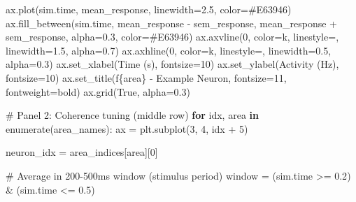 \documentclass[
  11pt,
  letterpaper,
  oneside,
  openany]{book}
\newenvironment{Shaded}{\begin{snugshade}}{\end{snugshade}}
\newcommand{\BuiltInTok}[1]{\textcolor[rgb]{0.00,0.23,0.31}{#1}}
\newcommand{\CommentTok}[1]{\textcolor[rgb]{0.37,0.37,0.37}{#1}}
\newcommand{\ControlFlowTok}[1]{\textcolor[rgb]{0.00,0.23,0.31}{\textbf{#1}}}
\newcommand{\DecValTok}[1]{\textcolor[rgb]{0.68,0.00,0.00}{#1}}
\newcommand{\FloatTok}[1]{\textcolor[rgb]{0.68,0.00,0.00}{#1}}
\newcommand{\KeywordTok}[1]{\textcolor[rgb]{0.00,0.23,0.31}{\textbf{#1}}}
\newcommand{\NormalTok}[1]{\textcolor[rgb]{0.00,0.23,0.31}{#1}}
\newcommand{\OperatorTok}[1]{\textcolor[rgb]{0.37,0.37,0.37}{#1}}
\newcommand{\SpecialCharTok}[1]{\textcolor[rgb]{0.37,0.37,0.37}{#1}}
\newcommand{\SpecialStringTok}[1]{\textcolor[rgb]{0.13,0.47,0.30}{#1}}
\newcommand{\StringTok}[1]{\textcolor[rgb]{0.13,0.47,0.30}{#1}}
\newcommand{\VariableTok}[1]{\textcolor[rgb]{0.07,0.07,0.07}{#1}}
\begin{document}
\begin{Shaded}
\begin{Highlighting}[]
\NormalTok{    ax.plot(sim.time, mean\_response, linewidth}\OperatorTok{=}\FloatTok{2.5}\NormalTok{, color}\OperatorTok{=}\StringTok{\textquotesingle{}\#E63946\textquotesingle{}}\NormalTok{)}
\NormalTok{    ax.fill\_between(sim.time, mean\_response }\OperatorTok{{-}}\NormalTok{ sem\_response, }
\NormalTok{                    mean\_response }\OperatorTok{+}\NormalTok{ sem\_response, alpha}\OperatorTok{=}\FloatTok{0.3}\NormalTok{, color}\OperatorTok{=}\StringTok{\textquotesingle{}\#E63946\textquotesingle{}}\NormalTok{)}
\NormalTok{    ax.axvline(}\DecValTok{0}\NormalTok{, color}\OperatorTok{=}\StringTok{\textquotesingle{}k\textquotesingle{}}\NormalTok{, linestyle}\OperatorTok{=}\StringTok{\textquotesingle{}{-}{-}\textquotesingle{}}\NormalTok{, linewidth}\OperatorTok{=}\FloatTok{1.5}\NormalTok{, alpha}\OperatorTok{=}\FloatTok{0.7}\NormalTok{)}
\NormalTok{    ax.axhline(}\DecValTok{0}\NormalTok{, color}\OperatorTok{=}\StringTok{\textquotesingle{}k\textquotesingle{}}\NormalTok{, linestyle}\OperatorTok{=}\StringTok{\textquotesingle{}{-}\textquotesingle{}}\NormalTok{, linewidth}\OperatorTok{=}\FloatTok{0.5}\NormalTok{, alpha}\OperatorTok{=}\FloatTok{0.3}\NormalTok{)}
\NormalTok{    ax.set\_xlabel(}\StringTok{\textquotesingle{}Time (s)\textquotesingle{}}\NormalTok{, fontsize}\OperatorTok{=}\DecValTok{10}\NormalTok{)}
\NormalTok{    ax.set\_ylabel(}\StringTok{\textquotesingle{}Activity (Hz)\textquotesingle{}}\NormalTok{, fontsize}\OperatorTok{=}\DecValTok{10}\NormalTok{)}
\NormalTok{    ax.set\_title(}\SpecialStringTok{f\textquotesingle{}}\SpecialCharTok{\{}\NormalTok{area}\SpecialCharTok{\}}\SpecialStringTok{ {-} Example Neuron\textquotesingle{}}\NormalTok{, fontsize}\OperatorTok{=}\DecValTok{11}\NormalTok{, fontweight}\OperatorTok{=}\StringTok{\textquotesingle{}bold\textquotesingle{}}\NormalTok{)}
\NormalTok{    ax.grid(}\VariableTok{True}\NormalTok{, alpha}\OperatorTok{=}\FloatTok{0.3}\NormalTok{)}

\CommentTok{\# Panel 2: Coherence tuning (middle row)}
\ControlFlowTok{for}\NormalTok{ idx, area }\KeywordTok{in} \BuiltInTok{enumerate}\NormalTok{(area\_names):}
\NormalTok{    ax }\OperatorTok{=}\NormalTok{ plt.subplot(}\DecValTok{3}\NormalTok{, }\DecValTok{4}\NormalTok{, idx }\OperatorTok{+} \DecValTok{5}\NormalTok{)}
    
\NormalTok{    neuron\_idx }\OperatorTok{=}\NormalTok{ area\_indices[area][}\DecValTok{0}\NormalTok{]}
    
    \CommentTok{\# Average in 200{-}500ms window (stimulus period)}
\NormalTok{    window }\OperatorTok{=}\NormalTok{ (sim.time }\OperatorTok{\textgreater{}=} \FloatTok{0.2}\NormalTok{) }\OperatorTok{\&}\NormalTok{ (sim.time }\OperatorTok{\textless{}=} \FloatTok{0.5}\NormalTok{)}
    

\end{Highlighting}
\end{Shaded}
\end{document}
